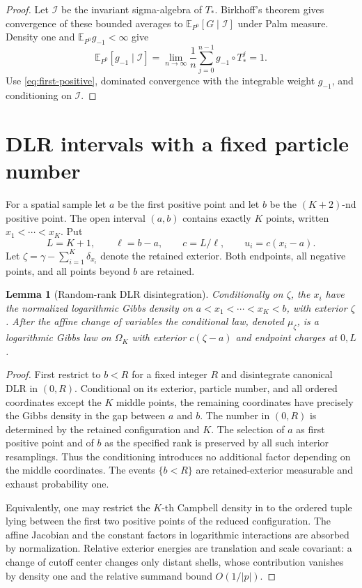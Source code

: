 \documentclass[11pt,reqno]{amsart}
\numberwithin{equation}{section}
\newtheorem{lemma}[theorem]{Lemma}
\theoremstyle{definition}
\theoremstyle{remark}
\newcommand{\E}{\mathbb E}
\newcommand{\1}{\mathbf 1}
\newcommand{\calI}{\mathcal I}
\begin{document}
\begin{proof}
Let $\calI$ be the invariant sigma-algebra of $T_*$. Birkhoff's theorem
gives convergence of these bounded averages to
$\E_{P^0}[G\mid\calI]$ under Palm measure.
Density one and $\E_{P^0}g_{-1}<\infty$ give
\[
\E_{P^0}[g_{-1}\mid\calI]
=\lim_{n\to\infty}\frac1n\sum_{j=0}^{n-1}g_{-1}\circ T_*^j=1.
\]
Use \eqref{eq:first-positive}, dominated convergence with the integrable
weight $g_{-1}$, and conditioning on $\calI$.
\end{proof}

\section{DLR intervals with a fixed particle number}\label{sec:blocks}

For a spatial sample let $a$ be the first positive point and let $b$ be
the $(K+2)$-nd positive point. The open interval $(a,b)$ contains exactly
$K$ points, written $x_1<\cdots<x_K$. Put
\[
L=K+1,\qquad \ell=b-a,\qquad c=L/\ell,\qquad
u_i=c(x_i-a).
\]
Let $\zeta=\gamma-\sum_{i=1}^K\delta_{x_i}$ denote the retained exterior.
Both endpoints, all negative points, and all points beyond $b$ are
retained.

\begin{lemma}[Random-rank DLR disintegration]\label{lem:random-dlr}
Conditionally on $\zeta$, the $x_i$ have the normalized logarithmic
Gibbs density on $a<x_1<\cdots<x_K<b$, with exterior $\zeta$.
After the affine change of variables the conditional law, denoted
$\mu_\zeta$, is a logarithmic Gibbs law on $\Omega_K$ with exterior
$c(\zeta-a)$ and endpoint charges at $0,L$.
\end{lemma}

\begin{proof}
First restrict to $b<R$ for a fixed integer $R$ and disintegrate
canonical DLR in $(0,R)$. Conditional on its exterior, particle number,
and all ordered coordinates except the $K$ middle points, the remaining
coordinates have precisely the Gibbs density in the gap between $a$
and $b$. The number in $(0,R)$ is determined by the retained
configuration and $K$. The selection of $a$ as first positive point and
of $b$ as the specified rank is preserved by all such interior
resamplings. Thus the conditioning introduces no additional factor
depending on the middle coordinates. The events $\{b<R\}$ are
retained-exterior measurable and exhaust probability one.

Equivalently, one may restrict the $K$-th Campbell density in
\cite[Theorem~3.7]{DHLM} to the ordered tuple lying between the first
two positive points of the reduced configuration.
The affine Jacobian and the constant factors in logarithmic
interactions are absorbed by normalization. Relative exterior energies
are translation and scale covariant: a change of cutoff center changes
only distant shells, whose contribution vanishes by density one and
the relative summand bound $O(1/|p|)$.
\end{proof}
\end{document}
